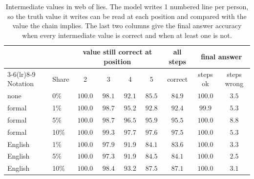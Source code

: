 \begin{table}[H]
\caption{Intermediate values in web of lies. The model writes 1 numbered line per person, so the truth value it writes can be read at each position and compared with the value the chain implies. The last two columns give the final answer accuracy when every intermediate value is correct and when at least one is not.}
\label{tab:steps}
\begin{center}
\small
\begin{tabular}{llccccccc}
\toprule
 & & \multicolumn{4}{c}{value still correct at position} & all steps & \multicolumn{2}{c}{final answer} \\
\cmidrule(lr){3-6}\cmidrule(lr){8-9}
Notation & Share & 2 & 3 & 4 & 5 & correct & steps ok & steps wrong \\
\midrule
none    & 0\%  & $100.0$ & $98.1$ & $92.1$ & $85.5$ & $84.9$ & $100.0$ & $3.5$ \\
formal  & 1\%  & $100.0$ & $98.7$ & $95.2$ & $92.8$ & $92.4$ & $99.9$ & $5.3$ \\
formal  & 5\%  & $100.0$ & $98.7$ & $96.5$ & $95.9$ & $95.5$ & $100.0$ & $8.8$ \\
formal  & 10\% & $100.0$ & $99.3$ & $97.7$ & $\mathbf{97.6}$ & $\mathbf{97.5}$ & $100.0$ & $5.3$ \\
English & 1\%  & $100.0$ & $97.9$ & $91.9$ & $84.1$ & $83.6$ & $100.0$ & $3.3$ \\
English & 5\%  & $100.0$ & $97.3$ & $91.9$ & $84.5$ & $84.1$ & $100.0$ & $2.5$ \\
English & 10\% & $100.0$ & $98.4$ & $93.2$ & $87.5$ & $87.1$ & $100.0$ & $3.1$ \\
\bottomrule
\end{tabular}
\end{center}
\end{table}
